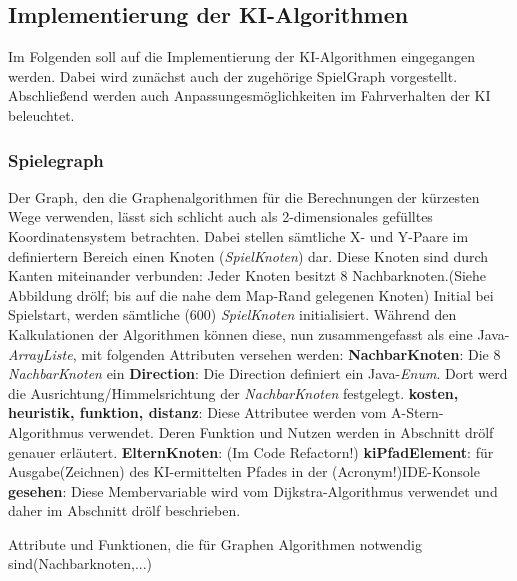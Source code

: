 \subsection{Implementierung der KI-Algorithmen}

Im Folgenden soll auf die Implementierung der KI-Algorithmen eingegangen werden.\newline
Dabei wird zunächst auch der zugehörige SpielGraph vorgestellt. Abschließend werden auch Anpassungesmöglichkeiten im Fahrverhalten der KI beleuchtet.

\subsubsection{Spielegraph}

Der Graph, den die Graphenalgorithmen für die Berechnungen der kürzesten Wege verwenden,
lässt sich schlicht auch als 2-dimensionales gefülltes Koordinatensystem betrachten.
Dabei stellen sämtliche X- und Y-Paare im definiertern Bereich einen Knoten (\textit{SpielKnoten}) dar.
Diese Knoten sind durch Kanten miteinander verbunden: Jeder Knoten besitzt 8 Nachbarknoten.(Siehe Abbildung drölf; bis auf die nahe dem Map-Rand gelegenen Knoten)
Initial bei Spielstart, werden sämtliche (600) \textit{SpielKnoten} initialisiert.
Während den Kalkulationen der Algorithmen können diese, nun zusammengefasst als eine Java-\textit{ArrayListe}, mit folgenden Attributen 
versehen werden:\newline
\textbf{NachbarKnoten}: Die 8 \textit{NachbarKnoten} ein\newline
\textbf{Direction}: Die Direction definiert ein Java-\textit{Enum}. Dort werd die Ausrichtung/Himmelsrichtung der \textit{NachbarKnoten} festgelegt.\newline
\textbf{kosten, heuristik, funktion, distanz}: Diese Attributee werden vom A-Stern-Algorithmus verwendet.
Deren Funktion und Nutzen werden in Abschnitt drölf genauer erläutert.\newline
\textbf{ElternKnoten}: (Im Code Refactorn!)\newline
\textbf{kiPfadElement}: für Ausgabe(Zeichnen) des KI-ermittelten Pfades in der (Acronym!)IDE-Konsole\newline
\textbf{gesehen}: Diese Membervariable wird vom Dijkstra-Algorithmus verwendet und daher im Abschnitt drölf beschrieben.\newline

Attribute und Funktionen, die für Graphen Algorithmen notwendig sind(Nachbarknoten,...)

